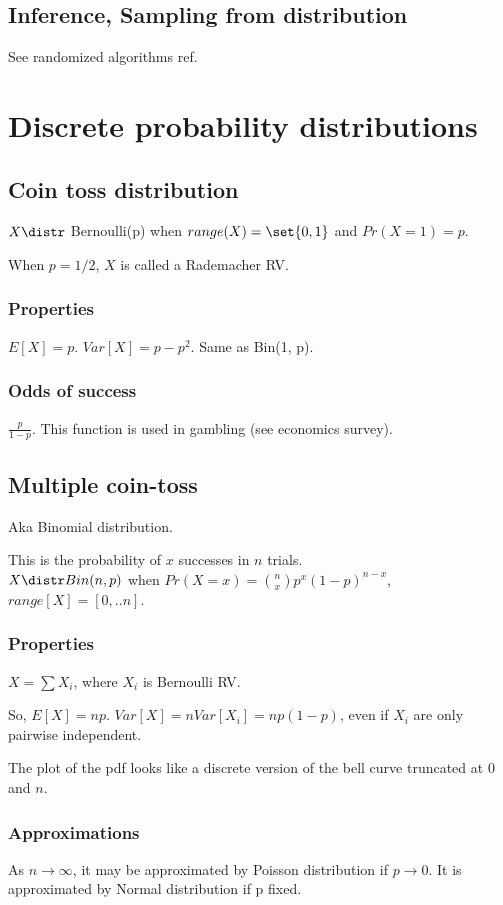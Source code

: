 \documentclass[oneside, article]{memoir}
\begin{document}
\section{Inference, Sampling from distribution}
See randomized algorithms ref.

\chapter{Discrete probability distributions}
\section{Coin toss distribution}
$X \distr$ Bernoulli(p) when $range(X) = \set{0, 1}$ and $Pr(X = 1) = p$.

When $p=1/2$, $X$ is called a Rademacher RV.

\subsection{Properties}
$E[X] = p$. $Var[X] = p-p^{2}$. Same as Bin(1, p).

\subsection{Odds of success}
$\frac{p}{1-p}$. This function is used in gambling (see economics survey).

\section{Multiple coin-toss}
Aka Binomial distribution.

This is the probability of $x$ successes in $n$ trials. \\
$X \distr Bin(n, p)$ when $Pr(X = x) = \binom{n}{x} p^{x}(1-p)^{n-x}$, $range[X] = [0, .. n]$.

\subsection{Properties}
$X = \sum X_{i}$, where $X_{i}$ is Bernoulli RV.

So, $E[X] = np$. $Var[X] = nVar[X_{i}] = np(1-p)$, even if $X_{i}$ are only pairwise independent.

The plot of the pdf looks like a discrete version of the bell curve truncated at 0 and $n$.

\subsection{Approximations}
As $n \to \infty$, it may be approximated by Poisson distribution if $p \to 0$. It is approximated by Normal distribution if p fixed.
\end{document}
